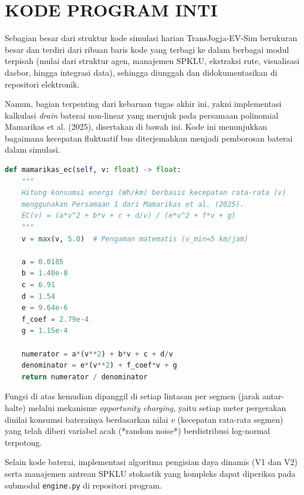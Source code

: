\cleardoublepage
\chapter{KODE PROGRAM INTI}

Sebagian besar dari struktur kode simulasi harian TransJogja-EV-Sim berukuran besar dan terdiri dari ribuan baris kode yang terbagi ke dalam berbagai modul terpisah (mulai dari struktur agen, manajemen SPKLU, ekstraksi rute, visualisasi dasbor, hingga integrasi data), sehingga diunggah dan didokumentasikan di repositori elektronik. 

Namun, bagian terpenting dari kebaruan tugas akhir ini, yakni implementasi kalkulasi \textit{drain} baterai non-linear yang merujuk pada persamaan polinomial Mamarikas et al. (2025), disertakan di bawah ini. Kode ini menunjukkan bagaimana kecepatan fluktuatif bus diterjemahkan menjadi pemborosan baterai dalam simulasi.

\begin{lstlisting}[language=Python, caption={Implementasi Model Konsumsi Energi Non-Linear Mamarikas}, label={lst:mamarikas-ec-lampiran}]
def mamarikas_ec(self, v: float) -> float:
    """
    Hitung konsumsi energi (Wh/km) berbasis kecepatan rata-rata (v)
    menggunakan Persamaan 1 dari Mamarikas et al. (2025).
    EC(v) = (a*v^2 + b*v + c + d/v) / (e*v^2 + f*v + g)
    """
    v = max(v, 5.0)  # Pengaman matematis (v_min=5 km/jam)
    
    a = 0.0185
    b = 1.40e-8
    c = 6.91
    d = 1.54
    e = 9.64e-6
    f_coef = 2.79e-4
    g = 1.15e-4
    
    numerator = a*(v**2) + b*v + c + d/v
    denominator = e*(v**2) + f_coef*v + g
    return numerator / denominator
\end{lstlisting}

Fungsi di atas kemudian dipanggil di setiap lintasan per segmen (jarak antar-halte) melalui mekanisme \textit{opportunity charging}, yaitu setiap meter pergerakan dinilai konsumsi baterainya berdasarkan nilai $v$ (kecepatan rata-rata segmen) yang telah diberi variabel acak (*random noise*) berdistribusi log-normal terpotong. 

Selain kode baterai, implementasi algoritma pengisian daya dinamis (V1 dan V2) serta manajemen antrean SPKLU stokastik yang kompleks dapat diperiksa pada submodul \texttt{engine.py} di repositori program.
